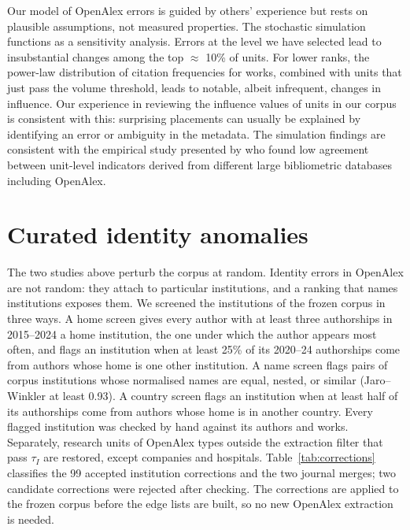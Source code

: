 Our model of OpenAlex errors is guided by others' experience \citep[e.g.][]{vaneckneesjanOpeningCWTSLeiden2024} but rests on plausible assumptions, not measured properties. The stochastic simulation functions as a sensitivity analysis. Errors at the level we have selected lead to insubstantial changes among the top $\approx$ 10\% of units. For lower ranks, the power-law distribution of citation frequencies for works, combined with units that just pass the volume threshold, leads to notable, albeit infrequent, changes in influence. Our experience in reviewing the influence values of units in our corpus is consistent with this: surprising placements can usually be explained by identifying an error or ambiguity in the metadata. The simulation findings are consistent with the empirical study presented by \textcite{scheidstegerHowSimilarAre2025} who found low agreement between unit-level indicators derived from different large bibliometric databases including OpenAlex.

\section{Curated identity anomalies}
\label{sec:anomalies}

The two studies above perturb the corpus at random. Identity errors in OpenAlex are not random: they attach to particular institutions, and a ranking that names institutions exposes them. We screened the institutions of the frozen corpus in three ways. A home screen gives every author with at least three authorships in 2015--2024 a home institution, the one under which the author appears most often, and flags an institution when at least 25\% of its 2020--24 authorships come from authors whose home is one other institution. A name screen flags pairs of corpus institutions whose normalised names are equal, nested, or similar (Jaro--Winkler at least 0.93). A country screen flags an institution when at least half of its authorships come from authors whose home is in another country. Every flagged institution was checked by hand against its authors and works. Separately, research units of OpenAlex types outside the extraction filter that pass $\tau_I$ are restored, except companies and hospitals. Table~\ref{tab:corrections} classifies the 99 accepted institution corrections and the two journal merges; two candidate corrections were rejected after checking. The corrections are applied to the frozen corpus before the edge lists are built, so no new OpenAlex extraction is needed.

